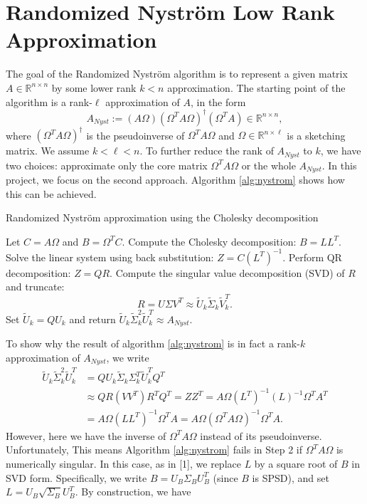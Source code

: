 \documentclass[a4paper, 12pt,oneside]{article}
\begin{document}
	\section{Randomized Nystr\"om Low Rank Approximation}\label{sec:nystrom-theory}
	The goal of the Randomized Nystr\"om algorithm is to represent a given matrix $A \in \mathbb{R}^{n \times n}$ by some lower rank $k<n$ approximation. The starting point of the algorithm is a rank-$\ell$ approximation of $A$, in the form
	\[
	A_{Nyst} := (A\Omega)(\Omega^T A \Omega)^{\dagger}(\Omega^T A) \in \mathbb{R}^{n \times n},
	\]
	where $(\Omega^T A \Omega)^\dagger$ is the pseudoinverse of $\Omega^T A \Omega$ and $\Omega \in \mathbb{R}^{n \times \ell}$ is a sketching matrix. We assume $k < \ell < n$. To further reduce the rank of $A_{Nyst}$ to $k$, we have two choices: approximate only the core matrix $\Omega^T A \Omega$ or the whole $A_{Nyst}$. In this project, we focus on the second approach. Algorithm \ref{alg:nystrom} shows how this can be achieved.
	\begin{algorithm}[H]
	\caption{Randomized Nystr\"om approximation using the Cholesky decomposition}
	\label{alg:nystrom}
	\begin{algorithmic}[1]
	\State Let $C = A\Omega$ and $B = \Omega^T C$.
	\State Compute the Cholesky decomposition: $B = LL^T$.
	\State Solve the linear system using back substitution: $Z = C(L^T)^{-1}$.
	\State Perform QR decomposition: $Z = QR$.
	\State Compute the singular value decomposition (SVD) of $R$ and truncate:
	\[ R = U \Sigma V^T \approx \tilde{U}_k \tilde{\Sigma}_k \tilde{V}_k^T. \]
	\State Set $\tilde{U}_k = Q{U}_k$ and return $\tilde{U}_k \tilde{\Sigma}_k^2 \tilde{U}_k^T \approx A_{Nyst}$.
	\end{algorithmic}
	\end{algorithm}
	To show why the result of algorithm \ref{alg:nystrom} is in fact a rank-$k$ approximation of $A_{Nyst}$, we write
	\begin{align*}
	\tilde{U}_k \tilde{\Sigma}_k^2 \tilde{U}_k^T &= Q{U}_k \tilde{\Sigma}_k {\Sigma}_k^T \tilde{U}_k^T Q^T \\
	&\approx QR(VV^T)R^T Q^T = ZZ^T = A\Omega(L^T)^{-1}(L)^{-1}\Omega^T A^T \\
	&= A\Omega(LL^T)^{-1}\Omega^T A = A\Omega(\Omega^T A \Omega)^{-1}\Omega^T A.
	\end{align*}
	However, here we have the inverse of $\Omega^T A \Omega$ instead of its pseudoinverse. Unfortunately, This means Algorithm \ref{alg:nystrom} fails in Step 2 if $\Omega^T A \Omega$ is numerically singular. In this case, as in [1], we replace $L$ by a square root of $B$ in SVD form. Specifically, we write $B = U_B \Sigma_B U_B^T$ (since $B$ is SPSD), and set $L = U_B \sqrt{\Sigma_B} U_B^T$. By construction, we have
\end{document}
